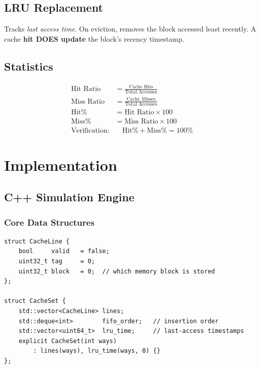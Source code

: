 \documentclass[12pt,a4paper]{report}
\begin{document}
\section{LRU Replacement}
Tracks \textit{last access time}. On eviction, removes the block accessed
least recently. A cache \textbf{hit DOES update} the block's recency timestamp.

\section{Statistics}
\begin{align}
\text{Hit Ratio}  &= \frac{\text{Cache Hits}}{\text{Total Accesses}} \\[6pt]
\text{Miss Ratio} &= \frac{\text{Cache Misses}}{\text{Total Accesses}} \\[6pt]
\text{Hit}\%      &= \text{Hit Ratio} \times 100 \\[6pt]
\text{Miss}\%     &= \text{Miss Ratio} \times 100 \\[6pt]
\text{Verification:} &\quad \text{Hit}\% + \text{Miss}\% = 100\%
\end{align}

\chapter{Implementation}

\section{C++ Simulation Engine}

\subsection{Core Data Structures}
\begin{lstlisting}[style=cppstyle, caption=Cache line structure (cache.h)]
struct CacheLine {
    bool     valid   = false;
    uint32_t tag     = 0;
    uint32_t block   = 0;  // which memory block is stored
};

struct CacheSet {
    std::vector<CacheLine> lines;
    std::deque<int>        fifo_order;   // insertion order
    std::vector<uint64_t>  lru_time;     // last-access timestamps
    explicit CacheSet(int ways)
        : lines(ways), lru_time(ways, 0) {}
};
\end{lstlisting}
\end{document}
